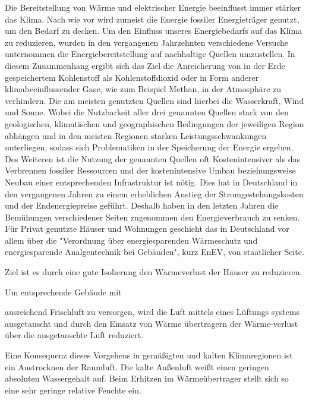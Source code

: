 \documentclass[ 11pt
				,ngerman
				,headsepline
				,headings=small
				,numbers=noenddot %
				,draft=false
				,BCOR=0mm %
				,DIV=12
				,captions=tableheading
				,paper=a4
				,abstracton
                ]{scrreprt}
\begin{document}
\begin{normalsize}
\begin{LARGE}

Die Bereitstellung von Wärme und elektrischer Energie beeinflusst immer stärker das Klima. Nach wie vor wird zumeist die Energie fossiler Energieträger genutzt, um den Bedarf zu decken. Um den Einfluss unseres Energiebedarfs auf das Klima zu reduzieren, wurden in den vergangenen Jahrzehnten verschiedene Versuche unternommen die Energiebereitstellung auf nachhaltige Quellen umzustellen. In diesem Zusammenhang ergibt sich das Ziel die Anreicherung von in der Erde gespeichertem Kohlenstoff als Kohlenstoffdioxid oder in Form anderer klimabeeinflussender Gase, wie zum Beispiel Methan, in der Atmosphäre zu verhindern. 
Die am meisten genutzten Quellen sind hierbei die Wasserkraft, Wind und Sonne. Wobei die Nutzbarkeit aller drei genannten Quellen stark von den geologischen, klimatischen und geographischen Bedingungen der jeweiligen Region abhängen und in den meisten Regionen starken Leistungsschwankungen unterliegen, sodass sich Problematiken in der Speicherung der Energie ergeben. Des Weiteren ist die Nutzung der genannten Quellen oft Kostenintensiver als das Verbrennen fossiler Ressourcen und der kostenintensive Umbau beziehungsweise Neubau einer entsprechenden Infrastruktur ist nötig. Dies hat in Deutschland in den vergangenen Jahren zu einem erheblichen Anstieg der Stromgestehungskosten und der Endenergiepreise geführt. Deshalb haben in den letzten Jahren die Bemühungen verschiedener Seiten zugenommen den Energieverbrauch zu senken. Für Privat genutzte Häuser und Wohnungen geschieht das in Deutschland vor allem über die "Verordnung über energiesparenden Wärmeschutz und energiesparende Analgentechnik bei Gebäuden", kurz EnEV,  von staatlicher Seite. 

Ziel ist es durch eine gute Isolierung den
 Wärmeverlust der Häuser zu reduzieren. 


Um entsprechende Gebäude mit 

ausreichend Frischluft zu versorgen,
 wird die Luft mittels eines Lüftungs
systems ausgetauscht und durch den Einsatz von Wärme
übertragern der Wärme-verlust über die ausgetauschte Luft reduziert. 

Eine Konsequenz dieses Vorgehens in gemäßigten und kalten Klimaregionen ist ein Austrocknen der Raumluft. Die kalte Außenluft weißt einen geringen absoluten Wassergehalt auf. Beim Erhitzen im Wärmeübertrager stellt sich so eine sehr geringe relative Feuchte ein. 


\end{LARGE}
\end{normalsize}
\end{document}
